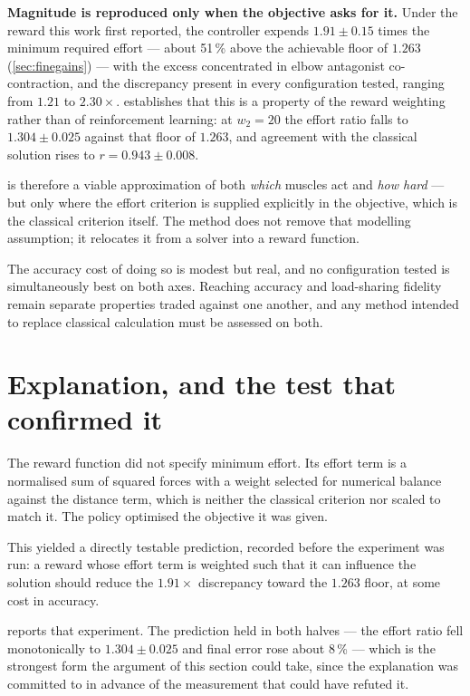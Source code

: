 \textbf{Magnitude is reproduced only when the objective asks for it.} Under the
reward this work first reported, the controller expends $1.91 \pm 0.15$ times the
minimum required effort --- about 51\,\% above the achievable floor of $1.263$
(\cref{sec:finegains}) --- with the excess concentrated in elbow antagonist
co-contraction, and the discrepancy present in every configuration tested,
ranging from $1.21$ to $2.30\times$.  establishes that this
is a property of the reward weighting rather than of reinforcement learning: at
$w_2 = 20$ the effort ratio falls to $1.304 \pm 0.025$ against that floor of
$1.263$, and agreement with the classical solution rises to
$r = 0.943 \pm 0.008$.

\DRL is therefore a viable approximation of both \emph{which} muscles act and
\emph{how hard} --- but only where the effort criterion is supplied explicitly in
the objective, which is the classical criterion itself. The method does not
remove that modelling assumption; it relocates it from a solver into a reward
function.

The accuracy cost of doing so is modest but real, and no configuration tested is
simultaneously best on both axes. Reaching accuracy and load-sharing fidelity
remain separate properties traded against one another, and any method intended to
replace classical calculation must be assessed on both.

\section{Explanation, and the test that confirmed it}
\label{sec:whygap}

The reward function did not specify minimum effort. Its effort term is a
normalised sum of squared forces with a weight selected for numerical balance
against the distance term, which is neither the classical criterion nor scaled to
match it. The policy optimised the objective it was given.

This yielded a directly testable prediction, recorded before the experiment was
run: a reward whose effort term is weighted such that it can influence the
solution should reduce the $1.91\times$ discrepancy toward the $1.263$ floor, at
some cost in accuracy.

 reports that experiment. The prediction held in both
halves --- the effort ratio fell monotonically to $1.304 \pm 0.025$ and final
error rose about 8\,\% --- which is the strongest form the argument of this
section could take, since the explanation was committed to in advance of the
measurement that could have refuted it.

